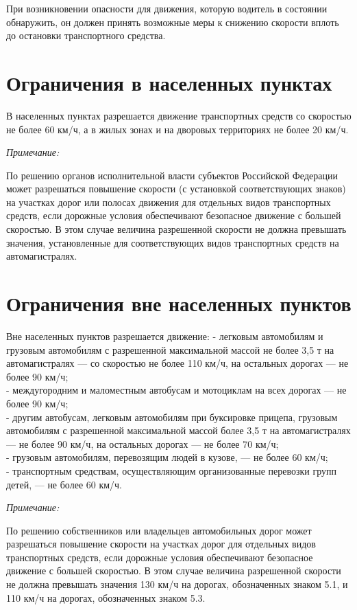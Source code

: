 \documentclass[russian,english,12pt,a4paper,reqno,dviphfm,oneside]{book}
\begin{document}
{При возникновении опасности для движения, которую водитель в состоянии обнаружить, он должен принять возможные меры к снижению скорости вплоть до остановки транспортного средства.

\section{Ограничения в населенных пунктах} В населенных пунктах разрешается движение транспортных средств со скоростью не более 60 км/ч, а в жилых зонах и на дворовых территориях не более 20 км/ч.

\textit{Примечание:}

По решению органов исполнительной власти субъектов Российской Федерации может разрешаться повышение скорости (с установкой соответствующих знаков) на участках дорог или полосах движения для отдельных видов транспортных средств, если дорожные условия обеспечивают безопасное движение с большей скоростью. В этом случае величина разрешенной скорости не должна превышать значения, установленные для соответствующих видов транспортных средств на автомагистралях.

\section{Ограничения вне населенных пунктов}
Вне населенных пунктов разрешается движение:
- легковым автомобилям и грузовым автомобилям с разрешенной максимальной массой не более 3,5 т на автомагистралях — со скоростью не более 110 км/ч, на остальных дорогах — не более 90 км/ч;\\
- междугородним и маломестным автобусам и мотоциклам на всех дорогах — не более 90 км/ч;\\
- другим автобусам, легковым автомобилям при буксировке прицепа, грузовым автомобилям с разрешенной максимальной массой более 3,5 т на автомагистралях — не более 90 км/ч, на остальных дорогах — не более 70 км/ч;\\
- грузовым автомобилям, перевозящим людей в кузове, — не более 60 км/ч;\\
- транспортным средствам, осуществляющим организованные перевозки групп детей, — не более 60 км/ч.

\textit{Примечание:}

По решению собственников или владельцев автомобильных дорог может разрешаться повышение скорости на участках дорог для отдельных видов транспортных средств, если дорожные условия обеспечивают безопасное движение с большей скоростью. В этом случае величина разрешенной скорости не должна превышать значения 130 км/ч на дорогах, обозначенных знаком 5.1, и 110 км/ч на дорогах, обозначенных знаком 5.3.

}
\end{document}
